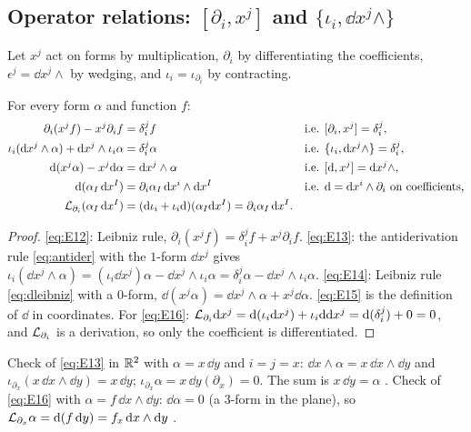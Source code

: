 \subsection{Operator relations: $[\partial_i,x^j]$ and $\{\iota_i,\dd x^j\wedge\}$}\label{sec:operators}

Let $x^j$ act on forms by multiplication, $\partial_i$ by differentiating the coefficients, $\epsilon^j=\dd x^j\wedge$ by wedging, and $\iota_i=\iota_{\partial_i}$ by contracting.

\begin{proposition}\label{prop:operators}
For every form $\alpha$ and function $f$:
\begin{align}
\partial_i(x^jf)-x^j\partial_if&=\delta^j_if &&\text{i.e. }[\partial_i,x^j]=\delta^j_i,\label{eq:E12}\\
\iota_i(\mathrm{d} x^j\wedge\alpha)+\mathrm{d} x^j\wedge\iota_i\alpha&=\delta^j_i\alpha &&\text{i.e. }\{\iota_i,\mathrm{d} x^j\wedge\}=\delta^j_i,\label{eq:E13}\\
\mathrm{d}(x^j\alpha)-x^j\mathrm{d}\alpha&=\mathrm{d} x^j\wedge\alpha &&\text{i.e. }[\mathrm{d},x^j]=\mathrm{d} x^j\wedge,\label{eq:E14}\\
\mathrm{d}(\alpha_I\,\mathrm{d} x^I)&=\partial_i\alpha_I\,\mathrm{d} x^i\wedge\mathrm{d} x^I &&\text{i.e. }\mathrm{d}=\mathrm{d} x^i\wedge\partial_i\text{ on coefficients,}\label{eq:E15}\\
\mathcal{L}_{\partial_i}(\alpha_I\,\mathrm{d} x^I)&=(\mathrm{d}\iota_i+\iota_i\mathrm{d})(\alpha_I\mathrm{d} x^I)=\partial_i\alpha_I\,\mathrm{d} x^I.\label{eq:E16}
\end{align}
\end{proposition}
\begin{proof}
\eqref{eq:E12}: Leibniz rule, $\partial_i(x^jf)=\delta^j_if+x^j\partial_if$. \eqref{eq:E13}: the antiderivation rule \eqref{eq:antider} with the $1$-form $\dd x^j$ gives $\iota_i(\dd x^j\wedge\alpha)=(\iota_i\dd x^j)\alpha-\dd x^j\wedge\iota_i\alpha=\delta^j_i\alpha-\dd x^j\wedge\iota_i\alpha$. \eqref{eq:E14}: Leibniz rule \eqref{eq:dleibniz} with a $0$-form, $\dd(x^j\alpha)=\dd x^j\wedge\alpha+x^j\dd\alpha$. \eqref{eq:E15} is the definition of $\dd$ in coordinates. For \eqref{eq:E16}: $\mathcal{L}_{\partial_i}\mathrm{d} x^j=\mathrm{d}(\iota_i\mathrm{d} x^j)+\iota_i\mathrm{d}\mathrm{d} x^j=\mathrm{d}(\delta^j_i)+0=0$, and $\mathcal{L}_{\partial_i}$ is a derivation, so only the coefficient is differentiated.
\end{proof}
\numcheck Check of \eqref{eq:E13} in $\mathbb{R}^2$ with $\alpha=x\,\dd y$ and $i=j=x$: $\dd x\wedge\alpha=x\,\dd x\wedge\dd y$ and $\iota_{\partial_x}(x\,\dd x\wedge\dd y)=x\,\dd y$; $\iota_{\partial_x}\alpha=x\,\dd y(\partial_x)=0$. The sum is $x\,\dd y=\alpha$ \checkmark.
Check of \eqref{eq:E16} with $\alpha=f\,\dd x\wedge\dd y$: $\dd\alpha=0$ (a $3$-form in the plane), so $\mathcal{L}_{\partial_x}\alpha=\mathrm{d}(f\,\mathrm{d} y)=f_x\,\mathrm{d} x\wedge\mathrm{d} y$ \checkmark.

